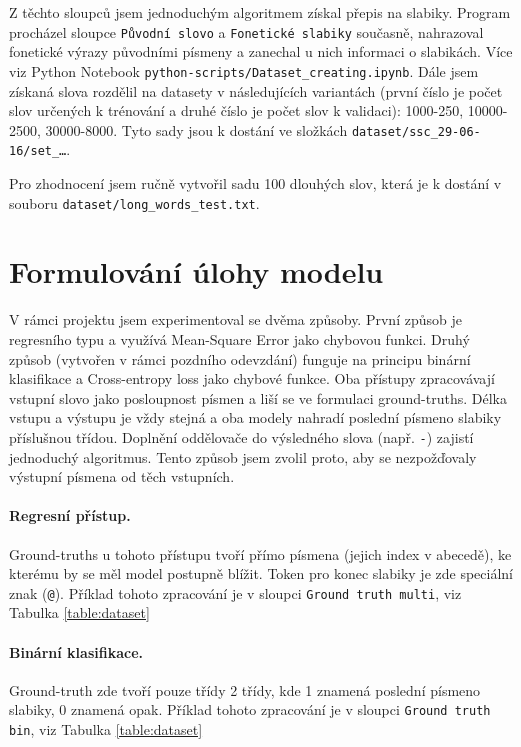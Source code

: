 \documentclass[a4paper]{article}
\theoremstyle{definition}
\begin{document}
Z těchto sloupců jsem jednoduchým algoritmem získal přepis na slabiky. Program procházel sloupce \texttt{Původní slovo} a \texttt{Fonetické slabiky} současně, nahrazoval fonetické výrazy původními písmeny a zanechal u nich informaci o slabikách. Více viz Python Notebook \texttt{python-scripts/Dataset\_creating.ipynb}.
Dále jsem získaná slova rozdělil na datasety v následujících variantách (první číslo je počet slov určených k trénování a druhé číslo je počet slov k validaci): 1000-250, 10000-2500, 30000-8000. Tyto sady jsou k dostání ve složkách \texttt{dataset/ssc\_29-06-16/set\_\dots{}}.

Pro zhodnocení jsem ručně vytvořil sadu 100 dlouhých slov, která je k dostání v souboru \texttt{dataset/long\_words\_test.txt}.

\section{Formulování úlohy modelu}

V rámci projektu jsem experimentoval se dvěma způsoby. První způsob je regresního typu a využívá Mean-Square Error jako chybovou funkci. Druhý způsob (vytvořen v rámci pozdního odevzdání) funguje na principu binární klasifikace a Cross-entropy loss jako chybové funkce.
Oba přístupy zpracovávají vstupní slovo jako posloupnost písmen a liší se ve formulaci ground-truths. Délka vstupu a výstupu je vždy stejná a oba modely nahradí poslední písmeno slabiky příslušnou třídou. Doplnění oddělovače do výsledného slova (např. \texttt{-}) zajistí jednoduchý algoritmus. Tento způsob jsem zvolil proto, aby se nezpožďovaly výstupní písmena od těch vstupních. 

\paragraph{Regresní přístup.}

Ground-truths u tohoto přístupu tvoří přímo písmena (jejich index v abecedě), ke kterému by se měl model postupně blížit. Token pro konec slabiky je zde speciální znak (\texttt{@}). 
Příklad tohoto zpracování je v sloupci \texttt{Ground truth multi}, viz Tabulka \ref{table:dataset}

\paragraph{Binární klasifikace.}

Ground-truth zde tvoří pouze třídy 2 třídy, kde 1 znamená poslední písmeno slabiky, 0 znamená opak.
Příklad tohoto zpracování je v sloupci \texttt{Ground truth bin}, viz Tabulka \ref{table:dataset}
\end{document}

